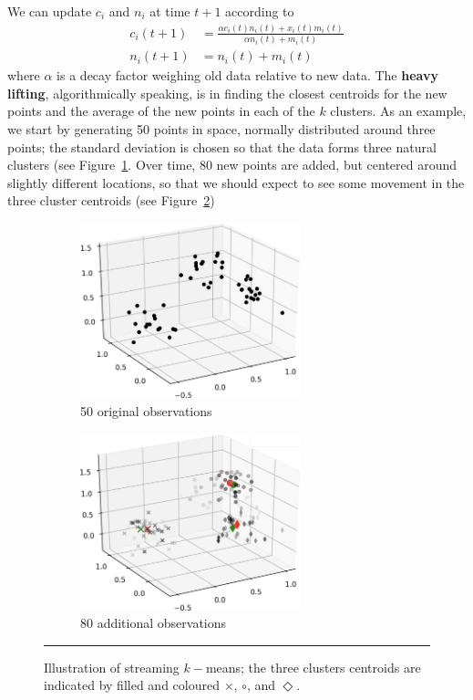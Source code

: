 We can update $c_i$ and $n_i$ at time $t+1$ according to 
\begin{align*}
c_i(t+1)&= \frac{\alpha c_i(t)n_i(t)+x_i(t)m_i(t)}{\alpha n_i(t)+m_i(t)}\\ 
n_i(t+1)&= n_i(t)+m_i(t)
\end{align*} where $\alpha$ is a decay factor weighing old data relative to new data. The \textbf{heavy lifting}, algorithmically speaking, is in finding the closest centroids for the new points and the average of the new points in each of the $k$ clusters.
\newl As an example, we start by generating 50 points in space, normally distributed around three points; the standard deviation is chosen so that the data forms three natural clusters (see Figure~\ref{fig:ds1}. 
Over time, 80 new points are added, but centered around slightly different locations, so that we should expect to see some movement in the three cluster centroids (see Figure~\ref{fig:ds2}) 
\begin{figure}[!t]
\centering 
\begin{subfigure}[c]{0.48\textwidth}
\includegraphics[width=0.7\textwidth]{images/DSML/DSt1.png}\caption{\small 50 original observations}\label{fig:ds1}
\end{subfigure}
\begin{subfigure}[c]{0.48\textwidth}
\includegraphics[width=0.7\textwidth]{images/DSML/DSt3.png}\caption{\small 80 additional  observations}\label{fig:ds2}
\end{subfigure}
\caption[\small Illustration of streaming $k-$means]{\small Illustration of streaming $k-$means; the three clusters centroids are indicated by filled and coloured $\times$, $\circ$, and $\Diamond$.}\hrule\label{fig:ds}
\end{figure}
